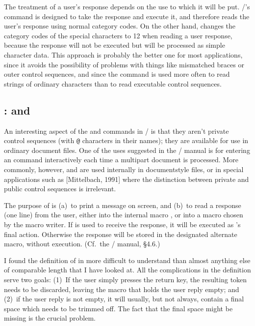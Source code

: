 {The treatment of a user's response depends on the use to which it
will be put. \latex/'s  command is designed to take the
response and execute it, and therefore reads the user's response
using normal category codes. On the other hand, 
\cite{testfont}
changes the category codes of the special characters to 12 when
reading a user response, because the response will not be executed
but will be processed as simple character data. This approach is
probably the better one for most applications, since it avoids the
possibility of problems with things like mismatched braces or outer
control sequences, and since the  command is used more often
to read strings of ordinary characters than to read executable control
sequences.


\subsection{:  and }

An interesting aspect of the  and  commands in
\latex/ is that they aren't private control sequences (with \verb|@|
characters in their names); they are available for use in ordinary
document files. One of the uses suggested in the \latex/ manual is for
entering an  command interactively each time a
multipart document is processed.  More commonly, however, 
and  are used internally in documentstyle files, or in
special applications such as  [Mittelbach, 1991]
where the distinction between private and public control sequences is
irrelevant.

The purpose of  is (a)~to print a message on screen, and
(b)~to
read a response (one line) from the user, either into the internal
macro , or into a macro chosen by the macro writer. If
 is used to receive the response, it will be executed as
's final action. Otherwise the response will be stored in
the designated alternate macro, without execution. (Cf.\ the \latex/
manual, \S4.6.)

I found the definition of  in  more difficult
to understand than almost anything else of comparable length that I
have looked at. All the complications in the definition serve two
goals: (1)~If the user simply presses the {\sc return} key, the
resulting  token needs to be discarded, leaving the macro that
holds the user reply empty; and (2)~if the user reply is not empty, it
will usually, but not always, contain a final space which needs to be
trimmed off. The fact that the final space might be missing is the
crucial problem.

}
